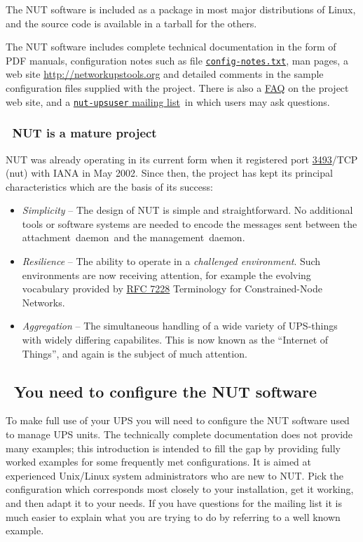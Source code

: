 \documentclass[12pt]{article}
\newlength{\headersep}\setlength{\headersep}{3mm}
\newcommand{\Hsep}{\hspace{\headersep}}
\newcommand{\ad}{\mbox{\textcolor{UPSDCOLOUR}{attachment daemon}}}
\newcommand{\md}{\mbox{\textcolor{MONCOLOUR}{management daemon}}}
\newcommand{\RFCcnn}{\href{https://www.rfc-editor.org/info/rfc7228}%
                          {RFC 7228} Terminology for Constrained-Node Networks}
\newcommand{\IANAnut}{\href{https://www.iana.org/assignments/service-names-port-numbers/service-names-port-numbers.xhtml?search=3493}%
                           {3493}}
\newcommand{\mailinglist}{\href{https://lists.alioth.debian.org/mailman/listinfo/nut-upsuser}%
                               {\texttt{nut-upsuser} mailing list}}
\newcommand{\ul}{\begin{itemize}%
   \setlength{\itemsep}{0em}}
\newcommand{\eul}{\end{itemize}}
\newcommand{\li}{\item}                 %
\begin{document}
The NUT software is included as a package in most major distributions of
Linux, and the source code is available in a tarball for the others.

The NUT software includes complete technical documentation in the form of PDF
manuals, configuration notes such as file
\href{https://github.com/networkupstools/nut/blob/master/docs/config-notes.txt}
     {\texttt{config{\allowbreak}-notes.txt}}, man pages, a web site
\href{http://networkupstools.org}{http://{\allowbreak}networkupstools{\allowbreak}.org}
and detailed comments in the sample configuration files supplied with the
project.  There is also a
\href{http://networkupstools.org/docs/FAQ.html}{FAQ} on the project web
site, and a \mailinglist\ in which users may ask questions.


\subsubsection{\Hsep\ NUT is a mature project}\label{matureproject}

NUT was already operating in its current form when it registered port
\IANAnut/TCP (nut) with IANA in May 2002.  Since then, the project has
kept its principal characteristics which are the basis of its success:

\ul

\li \textit{Simplicity} -- The design of NUT is simple and
straightforward.  No additional tools or software systems are needed
to encode the messages sent between the \ad\ and the \md.

\li \textit{Resilience} -- The ability to operate in a
\textit{challenged environment}.  Such environments are now receiving
attention, for example the evolving vocabulary provided by \RFCcnn.

\li \textit{Aggregation} -- The simultaneous handling of a wide variety of
UPS-things with widely differing capabilites.  This is now known as
the ``Internet of Things'', and again is the subject of much attention.

\eul

\subsection{\Hsep\ You need to configure the NUT software}\label{needtoconfigure}

To make full use of your UPS you will need to configure the NUT software used
to manage UPS units.  The technically complete documentation does not provide
many examples; this introduction is intended to fill the gap by providing
fully worked examples for some frequently met configurations.  It is aimed at
experienced Unix/Linux system administrators who are new to NUT.  Pick the
configuration which corresponds most closely to your installation, get it
working, and then adapt it to your needs.  If you have questions for the
mailing list it is much easier to explain what you are trying to do by
referring to a well known example.
\end{document}
